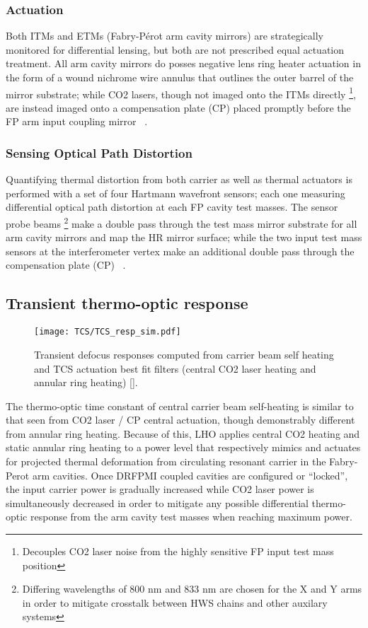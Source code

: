 \subsubsection{Actuation}
Both ITMs and ETMs (Fabry-P\'{e}rot arm cavity mirrors) are strategically monitored for differential lensing, but both are not prescribed equal actuation treatment. All arm cavity mirrors do posses negative lens ring heater actuation in the form of a wound nichrome wire annulus that outlines the outer barrel of the mirror substrate; while CO2 lasers, though not imaged onto the ITMs directly \footnote{Decouples CO2 laser noise from the highly sensitive FP input test mass position}, are instead imaged onto a compensation plate (CP) placed promptly before the FP arm input coupling mirror ~\cite{brooks:aigwd2019}.

\subsubsection{Sensing Optical Path Distortion}
Quantifying thermal distortion from both carrier as well as thermal actuators is performed with a set of four Hartmann wavefront sensors; each one measuring differential optical path distortion at each FP cavity test masses. The sensor probe beams \footnote{Differing wavelengths of 800 nm and 833 nm are chosen for the X and Y arms in order to mitigate crosstalk between HWS chains and other auxilary systems} make a double pass through the test mass mirror substrate for all arm cavity mirrors and map the HR mirror surface; while the two input test mass sensors at the interferometer vertex make an additional double pass through the compensation plate (CP) ~\cite{aasi:2015}.

\subsection{Transient thermo-optic response}
\begin{figure}[H]
  \centering
  \begin{subcaptiongroup}
	  \texttt{[image: TCS/TCS\_resp\_sim.pdf]}
	  \label{TO_response}
  \end{subcaptiongroup}
  \captionsetup{subrefformat=parens}
  \hfill
  \caption{Transient defocus responses computed from carrier beam self heating and TCS actuation best fit filters (central CO2 laser heating and annular ring heating) \autoref{}.} 
\label{fig:thermooptic_response}
\end{figure}
The thermo-optic time constant of central carrier beam self-heating is similar to that seen from CO2 laser / CP central actuation, though demonstrably different from annular ring heating. Because of this, LHO applies central CO2 heating and static annular ring heating to a power level that respectively mimics and actuates for projected thermal deformation from circulating resonant carrier in the Fabry-Perot arm cavities. Once DRFPMI coupled cavities are configured or ``locked'', the input carrier power is gradually increased while CO2 laser power is simultaneously decreased in order to mitigate any possible differential thermo-optic response from the arm cavity test masses when reaching maximum power.

